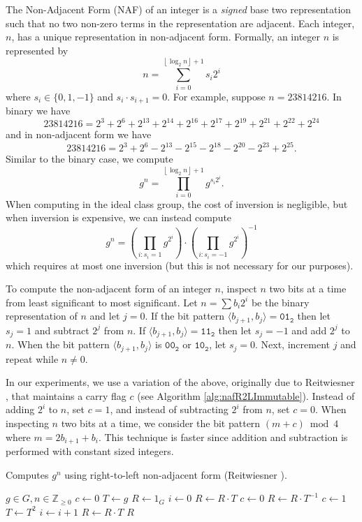 \documentclass{ucalgthes1}
\theoremstyle{definition}
\newcommand{\ZZgez}{\mathbb{Z}_{\ge 0}}
\newcommand{\floor}[1]{\left\lfloor #1 \right\rfloor}
\newcommand{\binary}[1]{\texttt{#1}_\texttt{2}}
\begin{document}
The Non-Adjacent Form (NAF) of an integer is a \emph{signed} base two representation such that no two non-zero terms in the representation are adjacent. Each integer, $n$, has a unique representation in non-adjacent form. Formally, an integer $n$ is represented by
\[
	n = \sum_{i=0}^{\floor{\log_2 n}+1} s_i 2^i
\]
where $s_i \in \{0, 1, -1\}$ and $s_i \cdot s_{i+1} = 0$.  For example, suppose $n = 23814216$.  In binary we have
\begin{equation}
\label{eq:binaryEg}
	23814216 = 2^3+2^6+2^{13}+2^{14}+2^{16}+2^{17}+2^{19}+2^{21}+2^{22}+2^{24}
\end{equation}
and in non-adjacent form we have
\begin{equation}
\label{eq:nafEg}
	23814216 = 2^3+2^6-2^{13}-2^{15}-2^{18}-2^{20}-2^{23}+2^{25}.
\end{equation}
Similar to the binary case, we compute
\[
	g^n = \prod _{i=0}^{\floor{\log_2 n}+1} g^{s_i 2^i}.
\]
When computing in the ideal class group, the cost of inversion is negligible, but when inversion is expensive, we can instead compute
\[
	g^n = \left( \prod_{i : s_i=1} g^{2^i} \right) \cdot \left( \prod_{i : s_i=-1} g^{2^i} \right)^{-1}
\]
which requires at most one inversion (but this is not necessary for our purposes).

To compute the non-adjacent form of an integer $n$, inspect $n$ two bits at a time from least significant to most significant.  Let $n=\sum b_i2^i$ be the binary representation of $n$ and let $j=0$.  If the bit pattern $\langle b_{j+1}, b_j \rangle = \binary{01}$ then let $s_j = 1$ and subtract $2^j$ from $n$.  If $\langle b_{j+1}, b_j \rangle = \binary{11}$ then let $s_j = -1$ and add $2^j$ to $n$.  When the bit pattern $\langle b_{j+1}, b_j \rangle$ is $\binary{00}$ or $\binary{10}$, let $s_j = 0$. Next, increment $j$ and repeat while $n \ne 0$.

In our experiments, we use a variation of the above, originally due to Reitwiesner \cite{reitwiesner1960}, that maintains a carry flag $c$ (see Algorithm \ref{alg:nafR2LImmutable}).  Instead of adding $2^i$ to $n$, set $c = 1$, and instead of subtracting $2^i$ from $n$, set $c = 0$.  When inspecting $n$ two bits at a time, we consider the bit pattern $(m+c) \bmod 4$ where $m = 2 b_{i+1} + b_i$.  This technique is faster since addition and subtraction is performed with constant sized integers.

\begin{algorithm}[h]
\caption{Computes $g^n$ using right-to-left non-adjacent form (Reitwiesner \cite{reitwiesner1960}).}
\label{alg:nafR2LImmutable}
\begin{algorithmic}[1]
\REQUIRE $g \in G, n \in \ZZgez$
\STATE $c \gets 0$ 
\STATE $T \gets g$ 
\STATE $R \gets 1_G$
\STATE $i \gets 0$
	\IF {$\floor{n/2^i}+c \equiv 1 \pmod 4$}
		\STATE $R \gets R \cdot T$
		\STATE $c \gets 0$
	\ELSIF {$\floor{n/2^i}+c \equiv 3 \pmod 4$}
		\STATE $R \gets R \cdot T^{-1}$
		\STATE $c \gets 1$
	\ENDIF
	\STATE $T \gets T^2$
	\STATE $i \gets i+1$
\ENDWHILE
{} \STATE $R \gets R \cdot T$ \ENDIF
\RETURN $R$
\end{algorithmic}
\end{algorithm}
\end{document}
